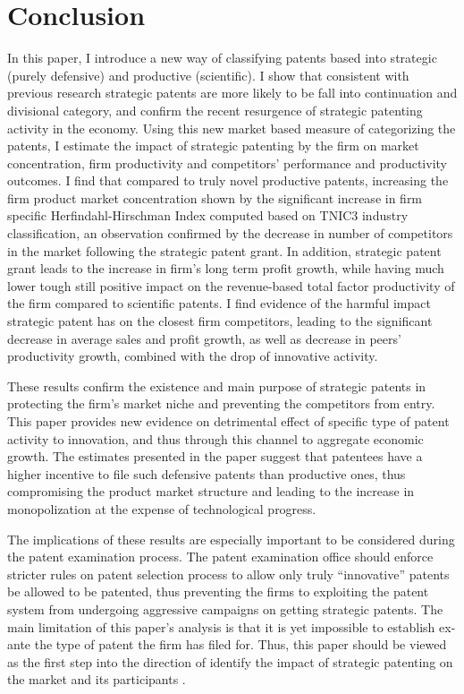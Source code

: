 \documentclass[11pt]{article}
\begin{document}
\section{Conclusion}
In this paper, I introduce a new way of classifying patents based into strategic (purely defensive) and productive (scientific). I show that consistent with previous research strategic patents are more likely to be fall into continuation and divisional category, and confirm the recent resurgence of strategic patenting activity in the economy. Using this new market based measure of categorizing the patents, I estimate the impact of strategic patenting by the firm on market concentration, firm productivity and competitors’ performance and productivity outcomes. I find that compared to truly novel productive patents, increasing the firm product market concentration shown by the significant increase in firm specific Herfindahl-Hirschman Index computed based on TNIC3 industry classification, an observation confirmed by the decrease in number of competitors in the market following the strategic patent grant. In addition, strategic patent grant leads to the increase in firm’s long term profit growth, while having much lower tough still positive impact on the revenue-based total factor productivity of the firm compared to scientific patents. I find evidence of the harmful impact strategic patent has on the closest firm competitors, leading to the significant decrease in average sales and profit growth, as well as decrease in peers’ productivity growth, combined with the drop of innovative activity. 

These results confirm the existence and main purpose of strategic patents in protecting the firm’s market niche and preventing the competitors from entry. This paper provides new evidence on detrimental effect of specific type of patent activity to innovation, and thus through this channel to aggregate economic growth. The estimates presented in the paper suggest that patentees have a higher incentive to file such defensive patents than productive ones, thus compromising the product market structure and leading to the increase in monopolization at the expense of technological progress. 

The implications of these results are especially important to be considered during the patent examination process. The patent examination office should enforce stricter rules on patent selection process to allow only truly “innovative” patents be allowed to be patented, thus preventing the firms to exploiting the patent system from undergoing aggressive campaigns on getting strategic patents. The main limitation of this paper’s analysis is that it is yet impossible to establish ex-ante the type of patent the firm has filed for. Thus, this paper should be viewed as the first step into the direction of identify the impact of strategic patenting on the market and its participants \cite{NBERw21959}. 
\end{document}

